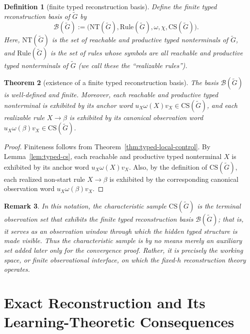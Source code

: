 \documentclass[11pt,a4paper]{article}
\newtheorem{theorem}{Theorem}[section]
\newtheorem{definition}[theorem]{Definition}
\newtheorem{remark}[theorem]{Remark}
\newcommand{\CS}{\mathrm{CS}}
\begin{document}
\begin{definition}[finite typed reconstruction basis]\label{def:typed-basis}
Define the finite typed reconstruction basis of $\widetilde G$ by
\[
\mathcal B(\widetilde G):=\bigl(\mathrm{NT}(\widetilde G),\mathrm{Rule}(\widetilde G),\omega,\chi,\CS(\widetilde G)\bigr).
\]
Here, $\mathrm{NT}(\widetilde G)$ is the set of reachable and productive
typed nonterminals of $\widetilde G$, and
$\mathrm{Rule}(\widetilde G)$ is the set of rules whose symbols are all
reachable and productive typed nonterminals of $\widetilde G$ (we call
these the ``realizable rules'').
\end{definition}

\begin{theorem}[existence of a finite typed reconstruction basis]\label{thm:finite-typed-basis}
The basis $\mathcal B(\widetilde G)$ is well-defined and finite.
Moreover, each reachable and productive typed nonterminal is exhibited
by its anchor word $u_X\omega(X)v_X\in\CS(\widetilde G)$, and each
realizable rule $X\to\beta$ is exhibited by its canonical observation
word $u_X\omega(\beta)v_X\in\CS(\widetilde G)$.
\end{theorem}

\begin{proof}
Finiteness follows from Theorem~\ref{thm:typed-local-control}. By
Lemma~\ref{lem:typed-cs}, each reachable and productive typed
nonterminal $X$ is exhibited by its anchor word
$u_X\omega(X)v_X$. Also, by the definition of $\CS(\widetilde G)$, each
realized non-start rule $X\to\beta$ is exhibited by the corresponding
canonical observation word $u_X\omega(\beta)v_X$.
\end{proof}

\begin{remark}
In this notation, the characteristic sample $\CS(\widetilde G)$ is the
terminal observation set that exhibits the finite typed reconstruction
basis $\mathcal B(\widetilde G)$; that is, it serves as an observation
window through which the hidden typed structure is made visible. Thus
the characteristic sample is by no means merely an auxiliary set added
later only for the convergence proof. Rather, it is precisely the
working space, or finite observational interface, on which the fixed-$h$
reconstruction theory operates.
\end{remark}

\section{Exact Reconstruction and Its Learning-Theoretic Consequences}
\label{sec:algo}
\end{document}
